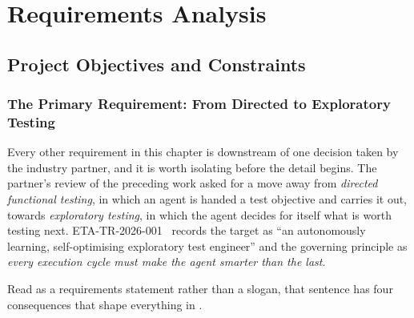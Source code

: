 \chapter{Requirements Analysis}
\label{ch:requirements}

\def\UrlBreaks{\do\/\do\_\do\-\do\.}
\newcommand{\modpath}[1]{\path{#1}}

\section{Project Objectives and Constraints}
\label{sec:requirements}

\subsection{The Primary Requirement: From Directed to Exploratory Testing}
\label{subsec:primary}

Every other requirement in this chapter is downstream of one decision taken by
the industry partner, and it is worth isolating before the detail begins. The
partner's review of the preceding work asked for a move away from
\emph{directed functional testing}, in which an agent is handed a test
objective and carries it out, towards \emph{exploratory testing}, in which the
agent decides for itself what is worth testing next.
ETA-TR-2026-001~\cite{etatr} records the target as ``an autonomously learning,
self-optimising exploratory test engineer'' and the governing principle as
\emph{every execution cycle must make the agent smarter than the last}.

Read as a requirements statement rather than a slogan, that sentence has four
consequences that shape everything in .

